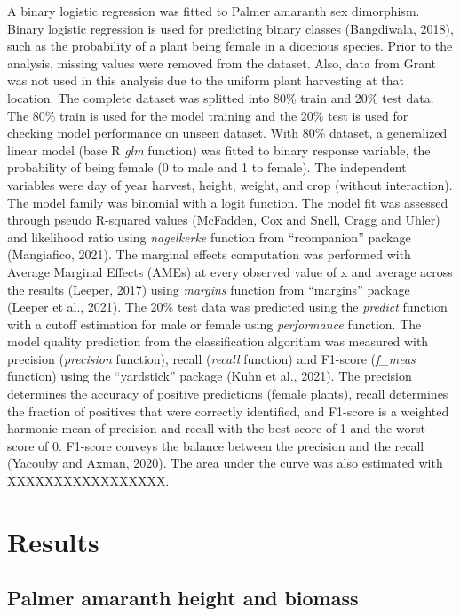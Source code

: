\documentclass[utf8]{frontiersSCNS}
\begin{document}
A binary logistic regression was fitted to Palmer amaranth sex
dimorphism. Binary logistic regression is used for predicting binary
classes (Bangdiwala, 2018), such as the probability of a plant being
female in a dioecious species. Prior to the analysis, missing values
were removed from the dataset. Also, data from Grant was not used in
this analysis due to the uniform plant harvesting at that location. The
complete dataset was splitted into 80\% train and 20\% test data. The
80\% train is used for the model training and the 20\% test is used for
checking model performance on unseen dataset. With 80\% dataset, a
generalized linear model (base R \emph{glm} function) was fitted to
binary response variable, the probability of being female (0 to male and
1 to female). The independent variables were day of year harvest,
height, weight, and crop (without interaction). The model family was
binomial with a logit function. The model fit was assessed through
pseudo R-squared values (McFadden, Cox and Snell, Cragg and Uhler) and
likelihood ratio using \emph{nagelkerke} function from ``rcompanion''
package (Mangiafico, 2021). The marginal effects computation was
performed with Average Marginal Effects (AMEs) at every observed value
of x and average across the results (Leeper, 2017) using \emph{margins}
function from ``margins'' package (Leeper et al., 2021). The 20\% test
data was predicted using the \emph{predict} function with a cutoff
estimation for male or female using \emph{performance} function. The
model quality prediction from the classification algorithm was measured
with precision (\emph{precision} function), recall (\emph{recall}
function) and F1-score (\emph{f\_meas} function) using the ``yardstick''
package (Kuhn et al., 2021). The precision determines the accuracy of
positive predictions (female plants), recall determines the fraction of
positives that were correctly identified, and F1-score is a weighted
harmonic mean of precision and recall with the best score of 1 and the
worst score of 0. F1-score conveys the balance between the precision and
the recall (Yacouby and Axman, 2020). The area under the curve was also
estimated with XXXXXXXXXXXXXXXXX.

\hypertarget{results}{%
\section*{Results}\label{results}}

\hypertarget{palmer-amaranth-height-and-biomass}{%
\subsection*{Palmer amaranth height and
biomass}\label{palmer-amaranth-height-and-biomass}}
\end{document}
